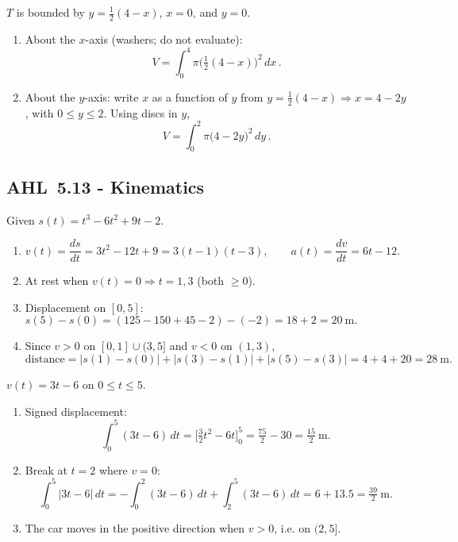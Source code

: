 \documentclass[11pt]{article}
\newcommand{\tocsubsection}[1]{\subsection{#1}}
\begin{document}
\begin{solution}
$T$ is bounded by $y=\tfrac12(4-x)$, $x=0$, and $y=0$.
\begin{enumerate}
\item About the $x$-axis (washers; do not evaluate):
\[
\boxed{\,V=\displaystyle\int_{0}^{4}\pi\Big(\tfrac12(4-x)\Big)^{2}\,dx\, }.
\]
\item About the $y$-axis: write $x$ as a function of $y$ from $y=\tfrac12(4-x)\Rightarrow x=4-2y$, with $0\le y\le 2$.
Using discs in $y$,
\[
\boxed{\,V=\displaystyle\int_{0}^{2}\pi\big(4-2y\big)^{2}\,dy\, }.
\]
\end{enumerate}
\end{solution}





\tocsubsection{AHL 5.13 - Kinematics}

\begin{solution}
Given \(s(t)=t^{3}-6t^{2}+9t-2\).
\begin{enumerate}
\item \(v(t)=\dfrac{ds}{dt}=3t^{2}-12t+9=3(t-1)(t-3),\qquad 
      a(t)=\dfrac{dv}{dt}=6t-12.\)
\item At rest when \(v(t)=0\Rightarrow t=1,3\) (both \(\ge0\)).
\item Displacement on \([0,5]\): \(s(5)-s(0)=(125-150+45-2)-(-2)=18+2=\boxed{20\ \text{m}}.\)
\item Since \(v>0\) on \([0,1]\cup(3,5]\) and \(v<0\) on \((1,3)\),
\[
\text{distance}=\big|s(1)-s(0)\big|+\big|s(3)-s(1)\big|+\big|s(5)-s(3)\big|
=4+4+20=\boxed{28\ \text{m}}.
\]
\end{enumerate}
\end{solution}

\begin{solution}
\(v(t)=3t-6\) on \(0\le t\le 5\).
\begin{enumerate}
\item Signed displacement:
\[
\int_{0}^{5}(3t-6)\,dt=\Big[\tfrac{3}{2}t^{2}-6t\Big]_{0}^{5}
=\tfrac{75}{2}-30=\boxed{\tfrac{15}{2}\ \text{m}}.
\]
\item Break at \(t=2\) where \(v=0\):
\[
\int_{0}^{5}\!\!|3t-6|\,dt
=-\!\!\int_{0}^{2}\!(3t-6)\,dt+\!\!\int_{2}^{5}\!(3t-6)\,dt
=6+13.5=\boxed{\tfrac{39}{2}\ \text{m}}.
\]
\item The car moves in the positive direction when \(v>0\), i.e. on \(\boxed{(2,5]}\).
\end{enumerate}
\end{solution}
\end{document}
